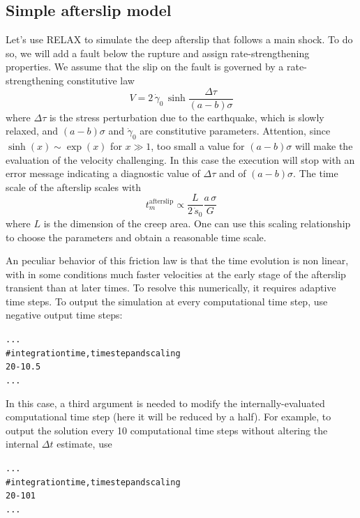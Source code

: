 \documentclass[10pt]{article}
\begin{document}
\subsection{Simple afterslip model}

Let's use RELAX to simulate the deep afterslip that follows a main shock. To do so, we will add a fault below the rupture and assign rate-strengthening properties. We assume that the slip on the fault is governed by a rate-strengthening constitutive law
\begin{equation}
V=2\,\dot{\gamma}_0\,\sinh\frac{\Delta\tau}{(a-b)\sigma}
\end{equation}
where $\Delta\tau$ is the stress perturbation due to the earthquake, which is slowly relaxed, and $(a-b)\sigma$ and $\dot{\gamma}_0$ are constitutive parameters. Attention, since $\sinh(x)\sim\exp(x)$ for $x\gg1$, too small a value for $(a-b)\sigma$ will make the evaluation of the velocity challenging. In this case the execution will stop with an error message indicating a diagnostic value of $\Delta\tau$ and of $(a-b)\sigma$. The time scale of the afterslip scales with
\begin{equation}
t_m^{\text{afterslip}}\propto\frac{L}{2\,\dot{s}_0}\frac{a\,\sigma}{G}
\end{equation}
where $L$ is the dimension of the creep area. One can use this scaling relationship to choose the parameters and obtain a reasonable time scale. 

An peculiar behavior of this friction law is that the time evolution is non linear, with in some conditions much faster velocities at the early stage of the afterslip transient than at later times. To resolve this numerically, it requires adaptive time steps. To output the simulation at every computational time step, use negative output time steps:
\begin{alltt}
...
# integration time, time step and scaling
{\color{NavyBlue}20 -1 0.5}
...
\end{alltt}
In this case, a third argument is needed to modify the internally-evaluated computational time step (here it will be reduced by a half). For example, to output the solution every 10 computational time steps without altering the internal $\Delta t$ estimate, use
\begin{alltt}
...
# integration time, time step and scaling
{\color{NavyBlue}20 -10 1}
...
\end{alltt}
\end{document}
